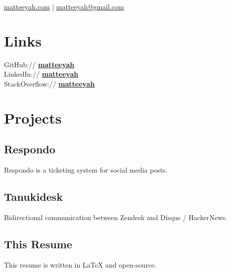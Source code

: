 \documentclass[]{matija-resume}
\begin{document}
%
%
\lastupdated

%
%
 {
\href{https://matteeyah.com}{matteeyah.com} |
\href{mailto:matteeyah@gmail.com}{matteeyah@gmail.com}
}

%
%

\begin{minipage}[t]{0.33\textwidth}



\section{Links}
GitHub:// \href{https://github.com/matteeyah}{\bf matteeyah \faExternalLink} \\
LinkedIn://  \href{https://www.linkedin.com/in/matteeyah}{\bf matteeyah \faExternalLink} \\
StackOverflow://  \href{https://stackoverflow.com/users/1139722/matteeyah}{\bf matteeyah \faExternalLink}


\section{Projects}
\subsection{Respondo}
Respondo is a ticketing system for social media posts.
\sectionsep
\subsection{Tanukidesk}
Bidirectional communication between Zendesk and Disqus / HackerNews.
\sectionsep
\subsection{This Resume}
This resume is written in LaTeX and open-source.


\end{minipage}
\end{document}
